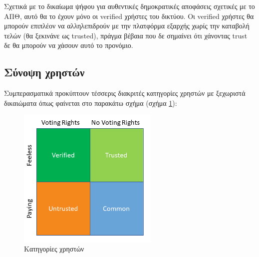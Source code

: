 Σχετικά με το δικαίωμα ψήφου για αυθεντικές δημοκρατικές αποφάσεις σχετικές με το ΑΠΘ, αυτό θα το έχουν μόνο οι verified
χρήστες του δικτύου. Οι verified χρήστες θα μπορούν επιπλέον να αλληλεπιδρούν με την πλατφόρμα εξαρχής χωρίς την
καταβολή τελών (θα ξεκινάνε ως trusted), πράγμα βέβαια που δε σημαίνει ότι χάνοντας trust δε θα μπορούν να χάσουν αυτό
το προνόμιο.

\subsection{Σύνοψη χρηστών}

Συμπερασματικά προκύπτουν τέσσερις διακριτές κατηγορίες χρηστών με ξεχωριστά δικαιώματα όπως φαίνεται στο παρακάτω
σχήμα (σχήμα \ref{figure:3-2-use-categories-diagram}):

\begin{figure}[H]
    \centering
    \includegraphics[width=0.6\textwidth]{assets/figures/chapter-3/user_categories}
    \caption{Κατηγορίες χρηστών}
    \label{figure:3-2-use-categories-diagram}
\end{figure}
